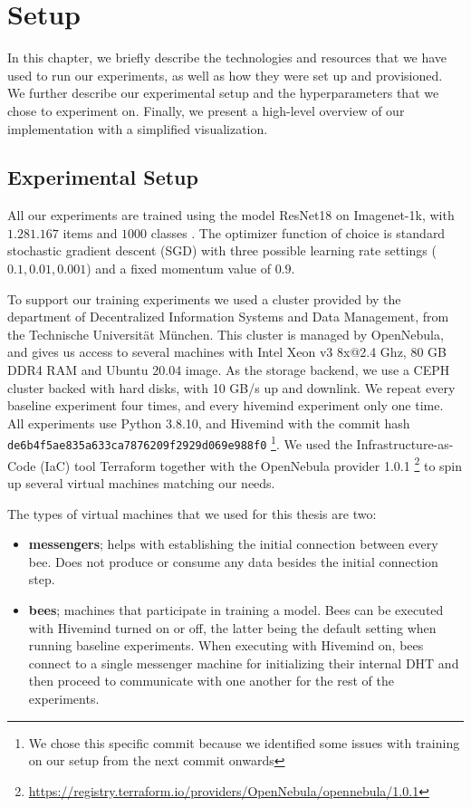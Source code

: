 \chapter{Setup}\label{chapter:setup}

In this chapter, we briefly describe the technologies and resources that we have used to run our experiments, as well as how they were set up and provisioned.
We further describe our experimental setup and the hyperparameters that we chose to experiment on.
Finally, we present a high-level overview of our implementation with a simplified visualization.

\section{Experimental Setup}

All our experiments are trained using the model ResNet18 \cite{he2015deep} on Imagenet-1k, with $1.281.167$ items and $1000$ classes \cite{deng2009imagenet}.
The optimizer function of choice is standard stochastic gradient descent (SGD) with three possible learning rate settings ($0.1, 0.01, 0.001$) and a fixed momentum value of $0.9$.

To support our training experiments we used a cluster provided by the department of Decentralized Information Systems and Data Management, from the Technische Universität München.
This cluster is managed by OpenNebula, and gives us access to several machines with Intel Xeon v3 8x@2.4 Ghz, 80 GB DDR4 RAM and Ubuntu 20.04 image.
As the storage backend, we use a CEPH cluster backed with hard disks, with 10 GB/s up and downlink.
We repeat every baseline experiment four times, and every hivemind experiment only one time.
All experiments use Python 3.8.10, and Hivemind with the commit hash \texttt{de6b4f5ae835a633ca7876209f2929d069e988f0}
\footnote{We chose this specific commit because we identified some issues with training on our setup from the next commit onwards}.
We used the Infrastructure-as-Code (IaC) tool Terraform together with the OpenNebula provider 1.0.1
\footnote{\href{https://registry.terraform.io/providers/OpenNebula/opennebula/1.0.1}{https://registry.terraform.io/providers/OpenNebula/opennebula/1.0.1}}
to spin up several virtual machines matching our needs.

The types of virtual machines that we used for this thesis are two:
\begin{itemize}
    \item \textbf{messengers}; helps with establishing the initial connection between every bee.
          Does not produce or consume any data besides the initial connection step.
    \item \textbf{bees}; machines that participate in training a model.
          Bees can be executed with Hivemind turned on or off, the latter being the default setting when running baseline experiments.
          When executing with Hivemind on, bees connect to a single messenger machine for initializing their internal DHT and then proceed to communicate with one another for the rest of the experiments.
\end{itemize}


